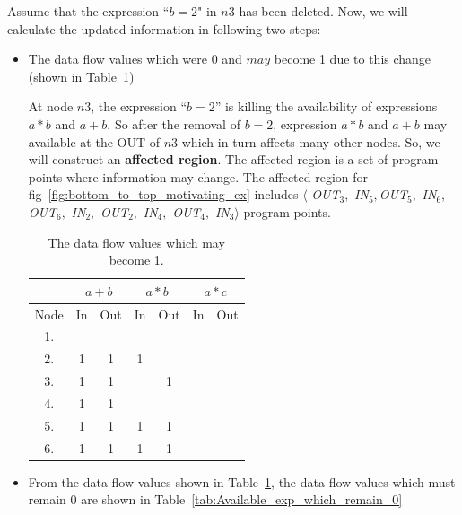 \documentclass[11pt,a4paper,openright]{report}
\begin{document}
Assume that the expression ``$b=2$" in $n3$ has been deleted. Now, we will calculate the updated information in following two steps:
\begin{itemize}
\item{The data flow values which were 0 and $may$ become 1 due to this change (shown in Table~\ref{tab:Available_exp_which_may_1})}

At node $n3$, the expression ``$b=2$'' is killing the availability of expressions $a*b$ and $a+b$. So after the removal of $b=2$, 
expression $a*b$ and $a+b$ may available at the OUT of $n3$ which in turn affects many other nodes. So, we will construct an \textbf{affected region}.  
The affected region is a set of program points where information may change. The affected region for fig~\ref{fig:bottom_to_top_motivating_ex} includes $\langle$ \textit{OUT}$_3,$ \textit{IN}$_5 ,$\textit{OUT}$_5,$
\textit{IN}$_6,$ \textit{OUT}$_6,$ \textit{IN}$_2 ,$ \textit{OUT}$_2,$ \textit{IN}$_4,$ \textit{OUT}$_4,$ \textit{IN}$_3 \rangle$ 
program points.


\begin{table}[H]
  \begin{center}
    \begin{tabular}{c c c c c c c }
    \hline
       & \multicolumn{2}{c}{$a+b$} & \multicolumn{2}{c}{$a*b$} & \multicolumn{2}{c}{$a*c$} \\
    \hline
      Node & In & Out & In & Out & In & Out\\
   	\midrule
   	  1. &  &  &  &  &  &  \\
   	  2. & 1 & 1 & 1 &  &  &  \\
   	  3. & 1 & 1 &  & 1 &  &  \\
   	  4. & 1 & 1 &  &  &  &  \\
   	  5. & 1 & 1 & 1 & 1 &  &  \\
   	  6. & 1 & 1 & 1 & 1 &  & \\
      
      \bottomrule 
    \end{tabular}
    \caption{The data flow values which may become 1.}
      \label{tab:Available_exp_which_may_1}
  \end{center}
\end{table}

\item{From the data flow values shown in Table~\ref{tab:Available_exp_which_may_1}, the data flow values which must remain 0 are shown in 
Table~\ref{tab:Available_exp_which_remain_0}}


\end{itemize}
\end{document}
